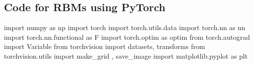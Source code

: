 \documentclass[%
oneside,                 %
final,                   %
10pt]{article}
\begin{document}
\subsection{Code for RBMs using PyTorch}









































































































\bpycod
import numpy as np
import torch
import torch.utils.data
import torch.nn as nn
import torch.nn.functional as F
import torch.optim as optim
from torch.autograd import Variable
from torchvision import datasets, transforms
from torchvision.utils import make_grid , save_image
import matplotlib.pyplot as plt
\end{document}

